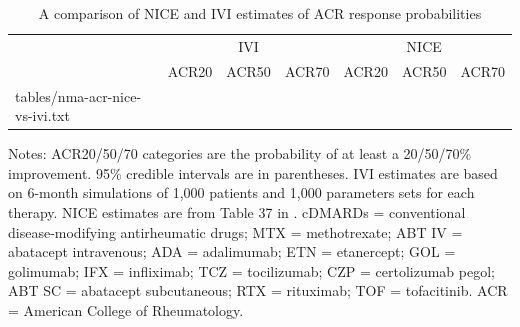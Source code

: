 \documentclass[11pt,final,fleqn]{article}
\makeatletter
\theoremstyle{plain}
\newcommand*\ExpandableInput[1]{\@@input#1 }
\makeatother
\begin{document}
\begin{appendices}
\begin{table}[!ht]
\begin{center}
\scriptsize
\begin{threeparttable}
\caption{A comparison of NICE and IVI estimates of ACR response probabilities} \label{tbl:nma-acr-nice-vs-ivi}
\begin{tabularx}{\textwidth}{@{\extracolsep{\fill}}lrrrrrr}
\hline
\multicolumn{1}{c}{} & \multicolumn{3}{c}{IVI} & \multicolumn{3}{c}{NICE}\\
\cmidrule(lr){2-4} \cmidrule(lr){5-7}
\multicolumn{1}{l}{} & \multicolumn{1}{c}{ACR20} & \multicolumn{1}{c}{ACR50} & \multicolumn{1}{c}{ACR70} & \multicolumn{1}{c}{ACR20} & \multicolumn{1}{c}{ACR50} & \multicolumn{1}{c}{ACR70}\\
\hline
\ExpandableInput{tables/nma-acr-nice-vs-ivi.txt}
\hline
\end{tabularx}
\scriptsize
Notes: ACR20/50/70 categories are the probability of at least a 20/50/70\% improvement. 95\% credible intervals are in parentheses. IVI estimates are based on 6-month simulations of 1,000 patients and 1,000 parameters sets for each therapy. NICE estimates are from Table 37 in \citet{stevenson2017cost}. cDMARDs = conventional disease-modifying antirheumatic drugs; MTX = methotrexate; ABT IV = abatacept intravenous; ADA = adalimumab; ETN = etanercept; GOL = golimumab; IFX = infliximab; TCZ = tocilizumab; CZP = certolizumab pegol; ABT SC = abatacept subcutaneous; RTX = rituximab; TOF = tofacitinib. ACR = American College of Rheumatology.
\end{threeparttable}
\end{center}
\end{table}

\end{appendices}


\end{document}
